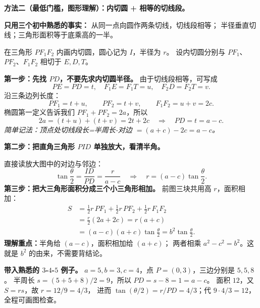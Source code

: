 \begin{proofbox}
\textbf{方法二（最低门槛，图形理解）：内切圆 + 相等的切线段。}

\textbf{只用三个初中熟悉的事实：}
从同一点向圆作两条切线，切线段相等；
半径垂直切线；三角形面积等于底乘高的一半。

在三角形 $PF_1F_2$ 内画内切圆，圆心记为 $I$，半径为 $r$。
设内切圆分别与 $PF_1$、$PF_2$、$F_1F_2$ 相切于 $E,D,T$。


\textbf{第一步：先找 $PD$，不要先求内切圆半径。}
由于切线段相等，可写成
\[
 PE=PD=t,\quad F_1E=F_1T=u,\quad F_2D=F_2T=v.
\]
沿三条边列长度：
\[
 PF_1=t+u,\qquad PF_2=t+v,\qquad F_1F_2=u+v=2c.
\]
椭圆第一定义告诉我们 $PF_1+PF_2=2a$，所以
\[
 2a=(t+u)+(t+v)=2t+2c
 \quad\Longrightarrow\quad\boxed{PD=t=a-c}.
\]
\emph{简单记法：顶点处切线段长=半周长-对边
$=(a+c)-2c=a-c$。}

\end{proofbox}
\clearpage
\begin{proofbox}
\textbf{第二步：把直角三角形 $PID$ 单独放大，看清半角。}

直接读放大图中的对边与邻边：
\[
 \tan\frac\theta2=\frac{ID}{PD}=\frac{r}{a-c}
 \quad\Longrightarrow\quad\boxed{r=(a-c)\tan\frac\theta2}.
\]
\textbf{第三步：把大三角形面积分成三个小三角形相加。}
前图三块共用高 $r$，面积相加：
\[
 \begin{aligned}
 S&=\frac12r\,PF_1+\frac12r\,PF_2+\frac12r\,F_1F_2\\
 &=\frac r2(2a+2c)=r(a+c)\\
 &=(a-c)(a+c)\tan\frac\theta2
 =\boxed{b^2\tan\frac\theta2}.
 \end{aligned}
\]
\textbf{理解重点：}半角给 $(a-c)$，面积相加给 $(a+c)$；
两者相乘 $a^2-c^2=b^2$。这就是 $b^2$ 的由来，不需要背结论。

\medskip
\textbf{带入熟悉的 $3$-$4$-$5$ 例子。}
$a=5,b=3,c=4$，点 $P=(0,3)$，三边分别是 $5,5,8$。
半周长 $s=(5+5+8)/2=9$，所以 $PD=s-8=1=a-c$。
面积 $12$，又 $S=rs$，故 $r=12/9=4/3$，
进而 $\tan(\theta/2)=r/PD=4/3$；代 $9\cdot4/3=12$，全程可画图检查。
\end{proofbox}
\clearpage


